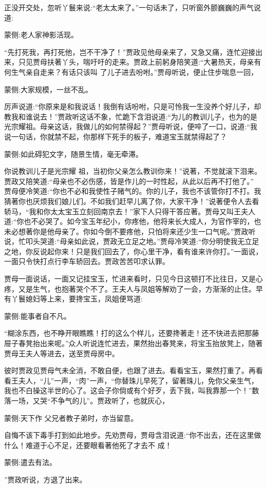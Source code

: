 \begin{parag}
    正没开交处，忽听丫鬟来说:“老太太来了。”一句话未了，只听窗外颤巍巍的声气说道:\begin{note}蒙侧:老人家神影活现。\end{note}“先打死我，再打死他，岂不干净了！”贾政见他母亲来了，又急又痛，连忙迎接出来，只见贾母扶著丫头，喘吁吁的走来。贾政上前躬身陪笑道:“大暑热天，母亲有何生气亲自走来？有话只该叫 了儿子进去吩咐。”贾母听说，便止住步喘息一回，\begin{note}蒙侧:大家规模，一丝不乱。\end{note}厉声说道:“你原来是和我说话！我倒有话吩咐，只是可怜我一生没养个好儿子，却教我和谁说去！”贾政听这话不象，忙跪下含泪说道:“为儿的教训儿子，也为的是光宗耀祖。母亲这话，我做儿的如何禁得起？”贾母听说，便啐了一口，说道:“我说一句话，你就禁不起，你那样下死手的板子，难道宝玉就禁得起了？\begin{note}蒙侧:如此碍犯文字，随景生情，毫无牵滞。\end{note}你说教训儿子是光宗耀 祖，当初你父亲怎么教训你来！”说著，不觉就滚下泪来。贾政又陪笑道:“母亲也不必伤感，皆是作儿的一时性起，从此以后再不打他了。” 贾母便冷笑道:“你也不必和我使性子赌气的。你的儿子，我也不该管你打不打。我猜著你也厌烦我们娘儿们。不如我们赶早儿离了你，大家干净！”说著便令人去看轿马，“我和你太太宝玉立刻回南京去！”家下人只得干答应著。贾母又叫王夫人道:“你也不必哭了。如今宝玉年纪小，你疼他，他将来长大成人，为官作宰的，也未必想著你是他母亲了。你如今倒不要疼他，只怕将来还少生一口气呢。”贾政听说，忙叩头哭道:“母亲如此说，贾政无立足之地。”贾母冷笑道:“你分明使我无立足之地，你反说起你来！只是我们回去了，你心里干净，看有谁来许你打。”一面说，一面只令快打点行李车轿回去。贾政苦苦叩求认罪。
\end{parag}


\begin{parag}
    贾母一面说话，一面又记挂宝玉，忙进来看时，只见今日这顿打不比往日，又是心疼，又是生气，也抱著哭个不了。王夫人与凤姐等解劝了一会，方渐渐的止住。早有丫鬟媳妇等上来，要搀宝玉，凤姐便骂道:\begin{note}蒙侧:能事者自不凡。\end{note}“糊涂东西，也不睁开眼瞧瞧！打的这么个样儿，还要搀著走！还不快进去把那藤 屉子春凳抬出来呢。”众人听说连忙进去，果然抬出春凳来，将宝玉抬放凳上，随著贾母王夫人等进去，送至贾母房中。
\end{parag}


\begin{parag}
    彼时贾政见贾母气未全消，不敢自便，也跟了进去。看看宝玉，果然打重了。再看看王夫人，“儿”一声，“肉”一声，“你替珠儿早死了，留著珠儿，免你父亲生气，我也不白操这半世的心了。这会子你倘或有个好歹，丢下我，叫我靠那一个！”数落一场，又哭“不争气的儿”。贾政听了，也就灰心，\begin{note}蒙侧:天下作 父兄者教子弟时，亦当留意。\end{note}自悔不该下毒手打到如此地步。先劝贾母，贾母含泪说道:“你不出去，还在这里做什么！难道于心不足，还要眼看著他死了才去不 成！\begin{note}蒙侧:遣去有法。\end{note}”贾政听说，方退了出来。
\end{parag}


